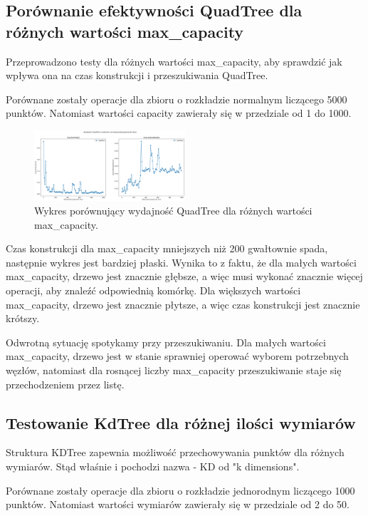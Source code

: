 \documentclass{lab}
\begin{document}
\newpage
\subsection{Porównanie efektywności QuadTree dla różnych wartości max\_capacity}
Przeprowadzono testy dla różnych wartości max\_capacity, aby sprawdzić jak wpływa ona na czas konstrukcji i przeszukiwania QuadTree.

Porównane zostały operacje dla zbioru o rozkładzie normalnym liczącego 5000 punktów.
Natomiast wartości capacity zawierały się w przedziale od 1 do 1000.

\begin{figure}[H]
  \centering
  \includegraphics[width=0.5\textwidth]{resources/capacity_graph.png}
  \caption{Wykres porównujący wydajność QuadTree dla różnych wartości max\_capacity.}
  \label{fig:capacity_graph}
\end{figure}

Czas konstrukcji dla max\_capacity mniejszych niż 200 gwałtownie spada, następnie wykres jest bardziej płaski. Wynika to z faktu, że dla małych wartości max\_capacity, drzewo jest znacznie głębsze, a więc musi wykonać znacznie więcej operacji, aby znaleźć odpowiednią komórkę. Dla większych wartości max\_capacity, drzewo jest znacznie płytsze, a więc czas konstrukcji jest znacznie krótszy.

Odwrotną sytuację spotykamy przy przeszukiwaniu. Dla małych wartości max\_capacity, drzewo jest w stanie sprawniej operować wyborem potrzebnych węzłów, natomiast dla rosnącej liczby max\_capacity przeszukiwanie staje się przechodzeniem przez listę.

\subsection{Testowanie KdTree dla różnej ilości wymiarów}
Struktura KDTree zapewnia możliwość przechowywania punktów dla różnych wymiarów.
Stąd właśnie i pochodzi nazwa - KD od "k dimensions".

Porównane zostały operacje dla zbioru o rozkładzie jednorodnym liczącego 1000 punktów.
Natomiast wartości wymiarów zawierały się w przedziale od 2 do 50.
\end{document}
